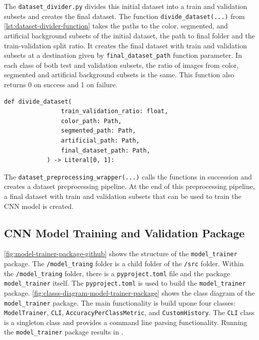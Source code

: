 \documentclass{BachelorBUI}
\begin{document}
        The \verb|dataset_divider.py| divides this initial dataset into a train and validation subsets and creates the final dataset. The function \verb|divide_dataset(...)| from \autoref{lst:dataset-divider-function} takes the paths to the color, segmented, and artificial background subsets of the initial dataset, the path to final folder and the train-validation split ratio. It creates the final dataset with train and validation subsets at a destination given by \verb|final_dataset_path| function parameter. In each class of both test and validation subsets, the ratio of images from color, segmented and artificial background subsets is the same. This function also returns 0 on success and 1 on failure.
        \begin{lstlisting}[caption={\centering Signature of the function defined in dataset\_divider.py}, label={lst:dataset-divider-function}, captionpos=b]
            def divide_dataset(
                train_validation_ratio: float,
                color_path: Path,
                segmented_path: Path,
                artificial_path: Path,
                final_dataset_path: Path,
            ) -> Literal[0, 1]:
        \end{lstlisting}

        The \verb|dataset_preprocessing_wrapper(...)| calls the functions in succession and creates a dataset preprocessing pipeline. At the end of this preprocessing pipeline, a final dataset with train and validation subsets that can be used to train the CNN model is created.

    \subsection{CNN Model Training and Validation Package}

        \autoref{fig:model-trainer-package-github} shows the structure of the \verb|model_trainer| package. The \verb|/model_traing| folder is a child folder of the \verb|/src| folder. Within the \verb|/model_traing| folder, there is a \verb|pyproject.toml| file and the package \verb|model_trainer| itself. The \verb|pyproject.toml| is used to build the \verb|model_trainer| package. \autoref{fig:classs-diagram-model-trainer-package} shows the class diagram of the \verb|model_trainer| package. The main functionality is build upone four classes: \verb|ModelTrainer|, \verb|CLI|, \verb|AccuracyPerClassMetric|, and \verb|CustomHistory|. The \verb|CLI| class is a singleton class and provides a command line parsing functionality. Running the \verb|model_trainer| package results in \verb||.
\end{document}
